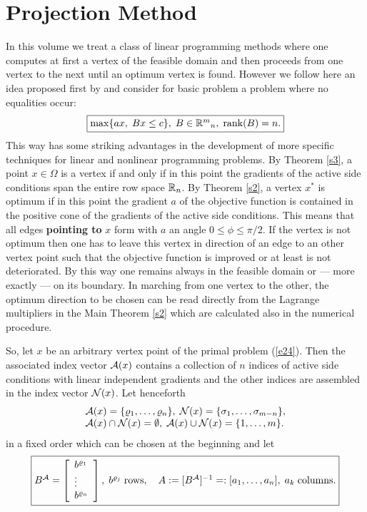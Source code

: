 \section{Projection Method}
%
In this volume we treat a class of linear programming methods where one
computes at first a vertex of the feasible domain and then proceeds from one
vertex to the next until an optimum vertex is found.  However we follow here
an idea proposed first by \cite{BeRi} and consider for basic problem a problem
where no equalities occur:
%
\begin{equation} \label{e24}
\fbox{$
\max\{ax, \; Bx \leq c\}, \; B \in \Bbb{R}^m{}_n, \; \rank (B) = n.
$}
\end{equation}
%
This way has some striking advantages in the development of more specific
techniques for linear and nonlinear programming problems.  By Theorem \ref{s3},
a point $x \in \Omega$ is a vertex if and only if in this point the gradients
of
the active side conditions span the entire row space $\Bbb{R}_n$.  By Theorem
\ref{s2}, a vertex $x^*$ is optimum if in this point the gradient $a$ of the
objective function is contained in the positive cone of the gradients of the
active side conditions.  This means that all edges {\bf pointing to} $x$ form
with $a$ an angle $0 \leq \phi \leq \pi/2$.  If the vertex is not optimum then
one has to leave this vertex in direction of an edge to an other vertex point
such that the objective function is improved or at least is not deteriorated.
By this way one remains always in the feasible domain or --- more exactly ---
on its boundary.  In marching from one vertex to the other, the optimum
direction to be chosen can be read directly from the {\sc Lagrange} multipliers
in the Main Theorem \ref{s2} which are calculated also in the
numerical procedure.
\par
So, let $x$ be an arbitrary vertex point of the primal problem (\ref{e24}).
Then the associated index vector $\A(x)$ contains a collection of $n$ indices
of active side conditions with linear independent gradients and the other
indices are assembled in the index vector $\N(x)$.  Let henceforth
\[ \ba{.}{l}
\A(x) = \{\rho _1, \ldots, \rho _n\}, \;
\N (x) = \{ \sigma _1, \ldots, \sigma _{m-n}\},\\
\A(x) \cap \N(x) = \emptyset, \; \A(x) \cup \N(x) = \{1,\ldots,m\}.
\ea{.}
\]
in a fixed order which can be chosen at the beginning and let
\[
\fbox{$
B^{\A} = \ba{[}{l} b^{\rho _1}\\ \vdots\\ b^{\rho _n} \ea{]}, \; b^{\rho _j}
\; \mbox{rows}, \quad A := [B^{\A}]^{-1} =: [a_1, \ldots, a_n], \; a_k \;
\mbox{columns}.
$}
\]
